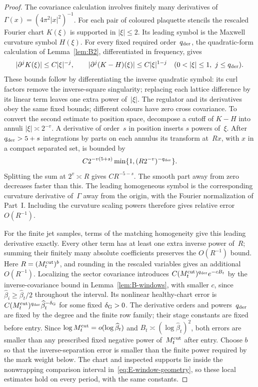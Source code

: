 \begin{proof}
The covariance calculation involves finitely many derivatives of $\Gamma(x)=(4\pi^2|x|^2)^{-1}$. For each pair of coloured plaquette stencils the rescaled Fourier chart $K(\xi)$ is supported in $|\xi|\le2$. Its leading symbol is the Maxwell curvature symbol $H(\xi)$. For every fixed required order~$q_{\rm der}$, the quadratic-form calculation of Lemma~\ref{lem:B2}, differentiated in frequency, gives
\begin{equation*}
 |\partial^jK(\xi)|\le C|\xi|^{-j},\qquad
 |\partial^j(K-H)(\xi)|\le C|\xi|^{1-j}
 \quad(0<|\xi|\le1,\ j\le q_{\rm der}).
\end{equation*}
These bounds follow by differentiating the inverse quadratic symbol: its curl factors remove the inverse-square singularity; replacing each lattice difference by its linear term leaves one extra power of~$|\xi|$. The regulator and its derivatives obey the same fixed bounds; different colours have zero cross covariance. To convert the second estimate to position space, decompose a cutoff of $K-H$ into annuli $|\xi|\asymp2^{-v}$. A derivative of order~$s$ in position inserts $s$ powers of~$\xi$. After $q_{\rm der}>5+s$ integrations by parts on each annulus its transform at~$Rx$, with $x$ in a compact separated set, is bounded by
\begin{equation*}
 C2^{-v(5+s)}\min\{1,(R2^{-v})^{-q_{\rm der}}\}.
\end{equation*}
Splitting the sum at $2^v\asymp R$ gives $CR^{-5-s}$. The smooth part away from zero decreases faster than this. The leading homogeneous symbol is the corresponding curvature derivative of~$\Gamma$ away from the origin, with the Fourier normalization of Part~I. Including the curvature scaling powers therefore gives relative error $O(R^{-1})$.

For the finite jet samples, terms of the matching homogeneity give this leading derivative exactly. Every other term has at least one extra inverse power of~$R$; summing their finitely many absolute coefficients preserves the $O(R^{-1})$ bound. Here $R=(M^{\mathrm{cut}}_t)^b$, and rounding in the rescaled variables gives an additional $O(R^{-1})$. Localizing the sector covariance introduces $C(M^{\mathrm{cut}}_t)^{q_{\rm der}} e^{-cB_t}$ by the inverse-covariance bound in Lemma~\ref{lem:B-windows}, with smaller $c$, since $\widehat\beta_i\ge\widehat\beta_t/2$ throughout the interval. Its nonlinear healthy-chart error is $C(M^{\mathrm{cut}}_t)^{q_{\rm der}}\widehat\beta_t^{-\delta_{\rm G}}$ for some fixed $\delta_{\rm G}>0$. The derivative orders and powers~$q_{\rm der}$ are fixed by the degree and the finite row family; their stage constants are fixed before entry. Since $\log M^{\mathrm{cut}}_t=o(\log\widehat\beta_t)$ and $B_t\asymp(\log\widehat\beta_t)^2$, both errors are smaller than any prescribed fixed negative power of~$M^{\mathrm{cut}}_t$ after entry. Choose $b$ so that the inverse-separation error is smaller than the finite power required by the mark weight below. The chart and inspected supports lie inside the nonwrapping comparison interval in~\eqref{eq:E-window-geometry}, so these local estimates hold on every period, with the same constants.



\end{proof}

